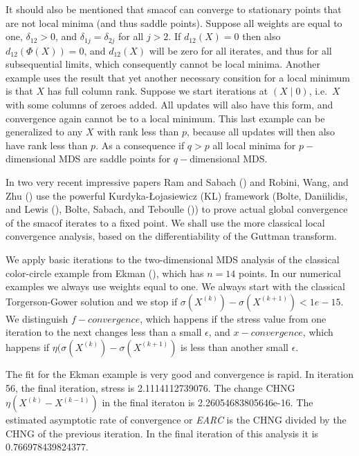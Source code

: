 \documentclass[
  12pt,
  letterpaper,
  DIV=11,
  numbers=noendperiod]{scrartcl}
\begin{document}
It should also be mentioned that smacof can converge to stationary
points that are not local minima (and thus saddle points). Suppose all
weights are equal to one, \(\delta_{12}>0\), and
\(\delta_{1j}=\delta_{2j}\) for all \(j>2\). If \(d_{12}(X)=0\) then
also \(d_{12}(\Phi(X))=0\), and \(d_{12}(X)\) will be zero for all
iterates, and thus for all subsequential limits, which consequently
cannot be local minima. Another example uses the result that yet another
necessary consition for a local minimum is that \(X\) has full column
rank. Suppose we start iterations at \((X\mid 0)\), i.e.~\(X\) with some
columns of zeroes added. All updates will also have this form, and
convergence again cannot be to a local minimum. This last example can be
generalized to any \(X\) with rank less than \(p\), because all updates
will then also have rank less than \(p\). As a consequence if \(q>p\)
all local minima for \(p-\)dimensional MDS are saddle points for
\(q-\)dimensional MDS.

In two very recent impressive papers Ram and Sabach
() and Robini, Wang, and
Zhu () use the powerful
Kurdyka-Łojasiewicz (KL) framework (Bolte, Daniilidis, and Lewis
(), Bolte, Sabach, and
Teboulle ()) to prove
actual global convergence of the smacof iterates to a fixed point. We
shall use the more classical local convergence analysis, based on the
differentiability of the Guttman transform.

We apply basic iterations to the two-dimensional MDS analysis of the
classical color-circle example from Ekman
(), which has \(n=14\) points. In our
numerical examples we always use weights equal to one. We always start
with the classical Torgerson-Gower solution and we stop if
\(\sigma(X^{(k)})-\sigma(X^{(k+1)})<1e-15\). We distinguish
\(f-convergence\), which happens if the stress value from one iteration
to the next changes less than a small \(\epsilon\), and
\(x-convergence\), which happens if
\(\eta(\sigma(X^{(k)})-\sigma(X^{(k+1)})\) is less than another small
\(\epsilon\).

The fit for the Ekman example is very good and convergence is rapid. In
iteration 56, the final iteration, stress is 2.1114112739076. The change
CHNG \(\eta(X^{(k)}-X^{(k-1)})\) in the final iteraton is
2.26054683805646e-16. The estimated asymptotic rate of convergence or
\emph{EARC} is the CHNG divided by the CHNG of the previous iteration.
In the final iteration of this analysis it is 0.766978439824377.
\end{document}
